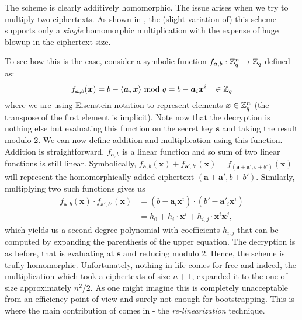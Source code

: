 The scheme is clearly additively homomorphic. The issue arises when we try to multiply two ciphertexts. As shown in \cite{one-mult}, the (slight variation of) this scheme supports only a \textit{single} homomorphic multiplication with the expense of huge blowup in the ciphertext size.

To see how this is the case, consider a symbolic function $f_{\boldsymbol{a},b} : \mathbb{Z}_q^n \rightarrow \mathbb{Z}_q$ defined as:
\[f_{\boldsymbol{a}, b}(\boldsymbol{x}) = b - \langle \boldsymbol{a, x} \rangle \text{ mod } q = b - \boldsymbol{a}_i \boldsymbol{x}^i \; \; \; \in \mathbb{Z}_q \]
where we are using Eisenstein notation to represent elements $\boldsymbol{x} \in \mathbb{Z}_q^n$ (the transpose of the first element is implicit). Note now that the decryption is nothing else but evaluating this function on the secret key $\bm{s}$ and taking the result modulo 2. We can now define addition and multiplication using this function. Addition is straightforward, $f_{\bm{a}, b}$ is a linear function and so sum of two linear functions is still linear. Symbolically, $f_{\bm{a},b}(\bm{x}) + f_{\bm{a}',b'}(\bm{x}) = f_{(\bm{a}+\bm{a}',b+b')}(\bm{x})$ will represent the homomorphically added ciphertext $(\bm{a}+\bm{a}',b+b')$. Similarly, multiplying two such functions gives us
\begin{equation}\label{mult}
  \begin{split}
  f_{\bm{a},b}(\bm{x}) \cdot f_{\bm{a}',b'}(\bm{x}) & = ( b - \bm{a}_i \bm{x}^i) \cdot ( b' - \bm{a}'_i \bm{x}^i ) \\
						    & = h_0 + h_i \cdot \bm{x}^i + h_{i,j} \cdot \bm{x}^i \bm{x}^j,
\end{split}
\end{equation}
which yields us a second degree polynomial with coefficients $h_{i,j}$ that can be computed by expanding the parenthesis of the upper equation. The decryption is as before, that is evaluating at $\bm{s}$ and reducing modulo 2. Hence, the scheme is trully homomorphic. Unfortunately, nothing in life comes for free and indeed, the multiplication which took a ciphertexts of size $n+1$, expanded it to the one of size approximately $n^2/2$. As one might imagine this is completely unacceptable from an efficiency point of view and surely not enough for bootstrapping. This is where the main contribution of \cite{fhe-lwe} comes in - the \textit{re-linearization} technique.
